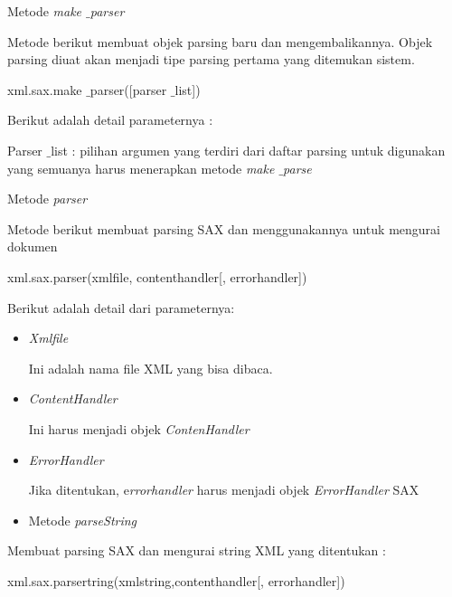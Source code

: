 \documentclass{wileySix}
\begin{document}
\begin{myEnumerate}
	\item Metode \textit{make $  \_  $parser} \par
	Metode berikut membuat objek parsing baru dan mengembalikannya. Objek parsing diuat akan menjadi tipe parsing pertama yang ditemukan sistem.  \par
	\vspace{10pt}
	{\fontsize{10pt}{10pt}\selectfont xml.sax.make $  \_  $parser([parser $  \_  $list])} \par
	\vspace{12pt}
	Berikut adalah detail parameternya : \par
	Parser $  \_  $list : pilihan argumen yang terdiri dari daftar parsing untuk digunakan yang semuanya harus menerapkan metode \textit{make $  \_  $parse} \par
	\noindent 
	\item Metode \textit{parser} \par
	Metode berikut membuat parsing SAX dan menggunakannya untuk mengurai dokumen \par
	\vspace{10pt}
	{\fontsize{10pt}{10pt}\selectfont xml.sax.parser(xmlfile, contenthandler[, errorhandler])} \par
	\vspace{10pt}
	Berikut adalah detail dari parameternya: \par
	\noindent 
	\begin{itemize}
		\item \textit{Xmlfile } \par
		Ini adalah nama file XML yang bisa dibaca. \par
		\noindent 
		\item \textit{ContentHandler } \par
		Ini harus menjadi objek \textit{ContenHandler} \par
		\noindent 
		\item \textit{ErrorHandler} \par
		Jika ditentukan, e\textit{rrorhandler} harus menjadi objek \textit{ErrorHandler} SAX \par
		\noindent 
		\item Metode\textit{ parseString}\end{itemize}
	\par
	Membuat parsing SAX dan mengurai string XML yang ditentukan : \par
	\vspace{12pt}
	{\fontsize{10pt}{10pt}\selectfont xml.sax.parsertring(xmlstring,contenthandler[, errorhandler])} \par

\end{myEnumerate}
\end{document}
